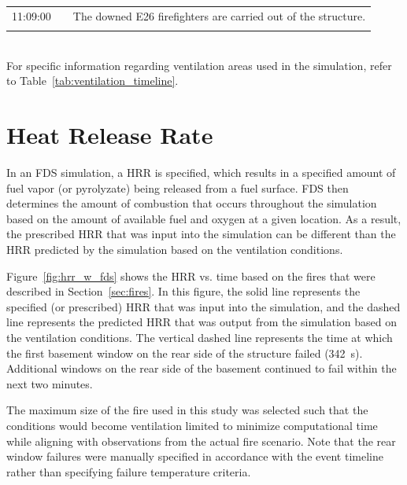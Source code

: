 \documentclass[12pt,oneside]{book}
\begin{document}
\begin{table}[!ht]
\begin{tabular}{ccl}
11:09:00       &              &  The downed E26 firefighters are carried out of the structure.       \\
               &              &                                                                      \\
\bottomrule
\end{tabular}
\footnotesize
\\ For specific information regarding ventilation areas used in the simulation, refer to Table~\ref{tab:ventilation_timeline}.
\normalsize
\label{tab:combined_timeline}
\end{table}


\clearpage


\section{Heat Release Rate}
\label{sec:HRR}

In an FDS simulation, a HRR is specified, which results in a specified amount of fuel vapor (or pyrolyzate) being released from a fuel surface. FDS then determines the amount of combustion that occurs throughout the simulation based on the amount of available fuel and oxygen at a given location. As a result, the prescribed HRR that was input into the simulation can be different than the HRR predicted by the simulation based on the ventilation conditions.

Figure~\ref{fig:hrr_w_fds} shows the HRR vs. time based on the fires that were described in Section~\ref{sec:fires}. In this figure, the solid line represents the specified (or prescribed) HRR that was input into the simulation, and the dashed line represents the predicted HRR that was output from the simulation based on the ventilation conditions. The vertical dashed line represents the time at which the first basement window on the rear side of the structure failed (342~s). Additional windows on the rear side of the basement continued to fail within the next two minutes.

The maximum size of the fire used in this study was selected such that the conditions would become ventilation limited to minimize computational time while aligning with observations from the actual fire scenario. Note that the rear window failures were manually specified in accordance with the event timeline rather than specifying failure temperature criteria.
\end{document}
